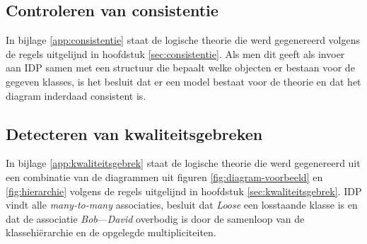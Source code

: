 \subsection{Controleren van consistentie}
In bijlage \ref{app:consistentie} staat de logische theorie die werd gegenereerd volgens de regels uitgelijnd in hoofdstuk \ref{sec:consistentie}. Als men dit geeft als invoer aan IDP samen met een structuur die bepaalt welke objecten er bestaan voor de gegeven klasses, is het besluit dat er een model bestaat voor de theorie en dat het diagram inderdaad consistent is.

\subsection{Detecteren van kwaliteitsgebreken}
In bijlage \ref{app:kwaliteitsgebrek} staat de logische theorie die werd gegenereerd uit een combinatie van de diagrammen uit figuren \ref{fig:diagram-voorbeeld} en \ref{fig:hierarchie} volgens de regels uitgelijnd in hoofdstuk \ref{sec:kwaliteitsgebrek}. IDP vindt alle \textit{many-to-many} associaties, besluit dat \textit{Loose} een losstaande klasse is en dat de associatie \textit{Bob}---\textit{David} overbodig is door de samenloop van de klassehi\"erarchie en de opgelegde multipliciteiten.